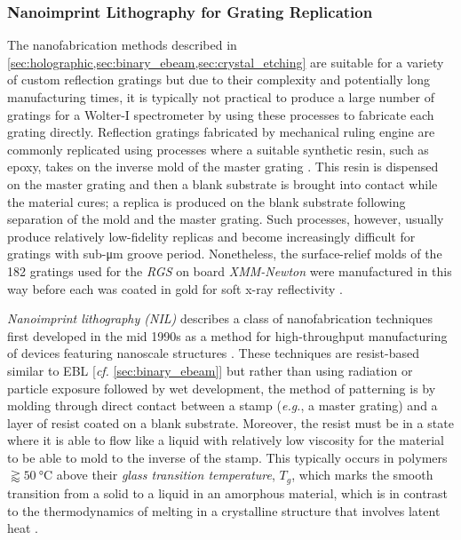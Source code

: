 \subsubsection{Nanoimprint Lithography for Grating Replication}\label{sec:nanoimprint}
The nanofabrication methods described in \cref{sec:holographic,sec:binary_ebeam,sec:crystal_etching} are suitable for a variety of custom reflection gratings but due to their complexity and potentially long manufacturing times, it is typically not practical to produce a large number of gratings for a Wolter-I spectrometer by using these processes to fabricate each grating directly. 
Reflection gratings fabricated by mechanical ruling engine are commonly replicated using processes where a suitable synthetic resin, such as epoxy, takes on the inverse mold of the master grating \cite{Loewen97,Franke97}.  
This resin is dispensed on the master grating and then a blank substrate is brought into contact while the material cures; a replica is produced on the blank substrate following separation of the mold and the master grating. 
Such processes, however, usually produce relatively low-fidelity replicas and become increasingly difficult for gratings with sub-\si{\um} groove period. 
Nonetheless, the surface-relief molds of the \num{182} gratings used for the \emph{RGS} on board \emph{XMM-Newton} were manufactured in this way before each was coated in gold for soft x-ray reflectivity \cite{Kahn96,denHerder01}. 

\emph{Nanoimprint lithography (NIL)} describes a class of nanofabrication techniques first developed in the mid 1990s as a method for high-throughput manufacturing of devices featuring nanoscale structures \cite{Chou96,Haisma96,Schift08,Schift10}. 
These techniques are resist-based similar to EBL [\emph{cf.\@} \cref{sec:binary_ebeam}] but rather than using radiation or particle exposure followed by wet development, the method of patterning is by molding through direct contact between a stamp (\emph{e.g.}, a master grating) and a layer of resist coated on a blank substrate. 
Moreover, the resist must be in a state where it is able to flow like a liquid with relatively low viscosity for the material to be able to mold to the inverse of the stamp. 
This typically occurs in polymers $\gtrapprox \SI{50}{\celsius}$ above their \emph{glass transition temperature}, $T_g$, which marks the smooth transition from a solid to a liquid in an amorphous material, which is in contrast to the thermodynamics of melting in a crystalline structure that involves latent heat \cite{Schift10,Kirchner19,Trolier-McKinstry17}. 


